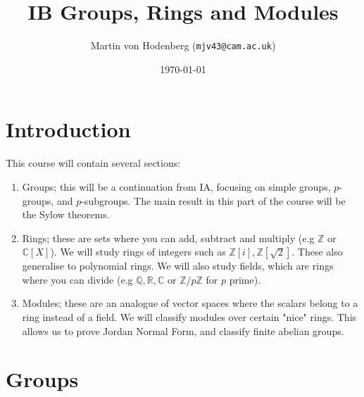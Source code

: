 \documentclass[a4paper]{scrartcl}
\title{IB Groups, Rings and Modules}
\author{Martin von Hodenberg (\texttt{mjv43@cam.ac.uk})}
\date{\today}
\begin{document}
\maketitle



\tableofcontents
\newpage
\section{Introduction}
This course will contain several sections: 
\begin{enumerate}
    \item Groups; this will be a continuation from IA, focusing on simple groups, $p$-groups, and $p$-subgroups. The main result in this part of the course will be the Sylow theorems.
    \item Rings; these are sets where you can add, subtract and multiply (e.g $\mathbb{Z}$ or $\mathbb{C}[X]$). We will study rings of integers such as $\mathbb{Z}[i], \mathbb{Z}[\sqrt{2}]$. These also generalise to polynomial rings. We will also study fields, which are rings where you can divide (e.g $\mathbb{Q},\mathbb{R},\mathbb{C}$ or $\mathbb{Z}/p\mathbb{Z}$ for $p$ prime).
    \item Modules; these are an analogue of vector spaces where the scalars belong to a ring instead of a field. We will classify modules over certain "nice" rings. This allows us to prove Jordan Normal Form, and classify finite abelian groups. 
\end{enumerate}

\section{Groups}
\end{document}
